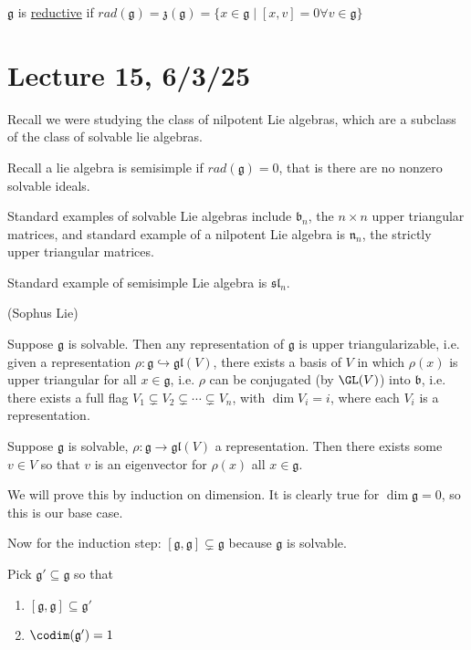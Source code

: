 \documentclass[x11names,reqno,14pt]{extarticle}
\newcommand{\mk}[1]{\mathfrak{#1}}
\newcommand{\g}{\mk{g}}
\newcommand{\rad}{rad}
\newcommand{\into}{\hookrightarrow}
\newcommand{\gl}{\mk{g}\mk{l}}
\renewcommand{\sl}{\mk{s}\mk{l}}
\begin{document}
$\g$ is \underline{reductive} if $\rad(\g) = \mk{z}(\g) = \{x \in \g\mid [x,v] = 0 \forall v \in \g\}$

\section*{Lecture 15, 6/3/25}

Recall we were studying the class of nilpotent Lie algebras, which are a subclass of the class of solvable lie algebras.

Recall a lie algebra is semisimple if $\rad(\g) = 0$, that is there are no nonzero solvable ideals. 

Standard examples of solvable Lie algebras include $\mk{b}_n$, the $n\times n$ upper triangular matrices, and standard example of a nilpotent Lie algebra is $\mk{n}_n$, the strictly upper triangular matrices. 

Standard example of semisimple Lie algebra is $\sl_n$. 

\thm(Sophus Lie)

Suppose $\g$ is solvable. Then any representation of $\g$ is upper triangularizable, i.e. given a representation $\rho:\g\into\gl(V)$, there exists a basis of $V$ in which $\rho(x)$ is upper triangular for all $x\in\g$, i.e. $\rho$ can be conjugated (by $\GL(V)$) into $\mk{b}$, i.e. there exists a full flag $V_1 \subsetneq V_2 \subsetneq \cdots \subsetneq V_n$, with $\dim V_i = i$, where each $V_i$ is a representation. 

\proof

\lem

Suppose $\g$ is solvable, $\rho:\g\to\gl(V)$ a representation. Then there exists some $v \in V$ so that $v$ is an eigenvector for $\rho(x)$ all $x \in \g$.

\proof

We will prove this by induction on dimension. It is clearly true for $\dim \g = 0$, so this is our base case. 

Now for the induction step: $[\g,\g]\subsetneq\g$ because $\g$ is solvable. 

Pick $\g'\subseteq\g$ so that 
\,
\begin{enumerate}

\item $[\g,\g]\subseteq\g'$

\item $\codim(\g') = 1$

\end{enumerate}
\end{document}
